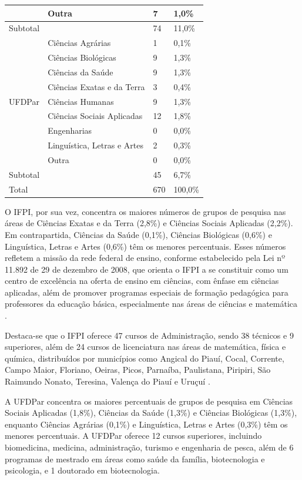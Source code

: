 \documentclass[portuguese]{textolivre}
\begin{document}
\begin{table}[htbp]
\begin{threeparttable}
\begin{tabular}{llll}
 & Outra & 7 & 1,0\% \\
\midrule
Subtotal & & 74 & 11,0\% \\
\midrule
\multirow{9}{*}{UFDPar} & Ciências Agrárias & 1 & 0,1\% \\
 & Ciências Biológicas & 9 & 1,3\% \\
 & Ciências da Saúde & 9 & 1,3\% \\
 & Ciências Exatas e da Terra & 3 & 0,4\% \\
 & Ciências Humanas & 9 & 1,3\% \\
 & Ciências Sociais Aplicadas & 12 & 1,8\% \\
 & Engenharias & 0 & 0,0\% \\
 & Linguística, Letras e Artes & 2 & 0,3\% \\
 & Outra & 0 & 0,0\% \\
\midrule
Subtotal & & 45 & 6,7\% \\
\midrule
Total & & 670 & 100,0\% \\
\bottomrule
\end{tabular}
\end{threeparttable}
\end{table}

O IFPI, por sua vez, concentra os maiores números de grupos de pesquisa nas áreas de Ciências Exatas e da Terra (2,8\%) e Ciências Sociais Aplicadas (2,2\%). Em contrapartida, Ciências da Saúde (0,1\%), Ciências Biológicas (0,6\%) e Linguística, Letras e Artes (0,6\%) têm os menores percentuais. Esses números refletem a missão da rede federal de ensino, conforme estabelecido pela Lei nº 11.892 de 29 de dezembro de 2008, que orienta o IFPI a se constituir como um centro de excelência na oferta de ensino em ciências, com ênfase em ciências aplicadas, além de promover programas especiais de formação pedagógica para professores da educação básica, especialmente nas áreas de ciências e matemática \cite{brasil2008}.

Destaca-se que o IFPI oferece 47 cursos de Administração, sendo 38 técnicos e 9 superiores, além de 24 cursos de licenciatura nas áreas de matemática, física e química, distribuídos por municípios como Angical do Piauí, Cocal, Corrente, Campo Maior, Floriano, Oeiras, Picos, Parnaíba, Paulistana, Piripiri, São Raimundo Nonato, Teresina, Valença do Piauí e Uruçuí \cite{ifpi2020}.

A UFDPar concentra os maiores percentuais de grupos de pesquisa em Ciências Sociais Aplicadas (1,8\%), Ciências da Saúde (1,3\%) e Ciências Biológicas (1,3\%), enquanto Ciências Agrárias (0,1\%) e Linguística, Letras e Artes (0,3\%) têm os menores percentuais. A UFDPar oferece 12 cursos superiores, incluindo biomedicina, medicina, administração, turismo e engenharia de pesca, além de 6 programas de mestrado em áreas como saúde da família, biotecnologia e psicologia, e 1 doutorado em biotecnologia.
\end{document}
